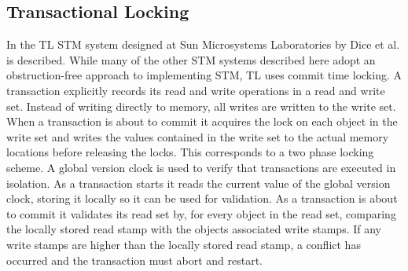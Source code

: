 \subsection{Transactional Locking }
In \cite{dice2006transactional} the TL \ac{STM} system designed at Sun Microsystems Laboratories by Dice et al. is described. While many of the other \ac{STM} systems described here adopt an obstruction-free approach to implementing \ac{STM}, TL uses commit time locking\cite[p. 199]{dice2006transactional}. A transaction explicitly records its read and write operations in a read and write set\cite[p. 198]{dice2006transactional}. Instead of writing directly to memory, all writes are written to the write set. When a transaction is about to commit it acquires the lock on each object in the write set and writes the values contained in the write set to the actual memory locations before releasing the locks\cite[p. 200]{dice2006transactional}. This corresponds to a two phase locking scheme\cite[p. 455]{tanenbaum2008modern}. A global version clock is used to verify that transactions are executed in isolation\cite[p. 201]{dice2006transactional}. As a transaction starts it reads the current value of the global version clock, storing it locally so it can be used for validation. As a transaction is about to commit it validates its read set by, for every object in the read set, comparing the locally stored read stamp with the objects associated write stamps\cite[p. 200]{dice2006transactional}. If any write stamps are higher than the locally stored read stamp, a conflict has occurred and the transaction must abort and restart. 

